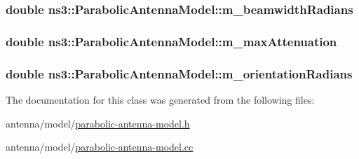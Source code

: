 \subsubsection[{\texorpdfstring{m\+\_\+beamwidth\+Radians}{m_beamwidthRadians}}]{\setlength{\rightskip}{0pt plus 5cm}double ns3\+::\+Parabolic\+Antenna\+Model\+::m\+\_\+beamwidth\+Radians\hspace{0.3cm}{\ttfamily [private]}}\hypertarget{classns3_1_1ParabolicAntennaModel_a9a4137e4c90035b160c25cca1579fb90}{}\label{classns3_1_1ParabolicAntennaModel_a9a4137e4c90035b160c25cca1579fb90}
\subsubsection[{\texorpdfstring{m\+\_\+max\+Attenuation}{m_maxAttenuation}}]{\setlength{\rightskip}{0pt plus 5cm}double ns3\+::\+Parabolic\+Antenna\+Model\+::m\+\_\+max\+Attenuation\hspace{0.3cm}{\ttfamily [private]}}\hypertarget{classns3_1_1ParabolicAntennaModel_a9521583c748b17a971c545c7e1dda81f}{}\label{classns3_1_1ParabolicAntennaModel_a9521583c748b17a971c545c7e1dda81f}
\subsubsection[{\texorpdfstring{m\+\_\+orientation\+Radians}{m_orientationRadians}}]{\setlength{\rightskip}{0pt plus 5cm}double ns3\+::\+Parabolic\+Antenna\+Model\+::m\+\_\+orientation\+Radians\hspace{0.3cm}{\ttfamily [private]}}\hypertarget{classns3_1_1ParabolicAntennaModel_a3435b4520797e573dfccd00718f331c4}{}\label{classns3_1_1ParabolicAntennaModel_a3435b4520797e573dfccd00718f331c4}


The documentation for this class was generated from the following files\+:\begin{DoxyCompactItemize}
\item 
antenna/model/\hyperlink{parabolic-antenna-model_8h}{parabolic-\/antenna-\/model.\+h}\item 
antenna/model/\hyperlink{parabolic-antenna-model_8cc}{parabolic-\/antenna-\/model.\+cc}\end{DoxyCompactItemize}
